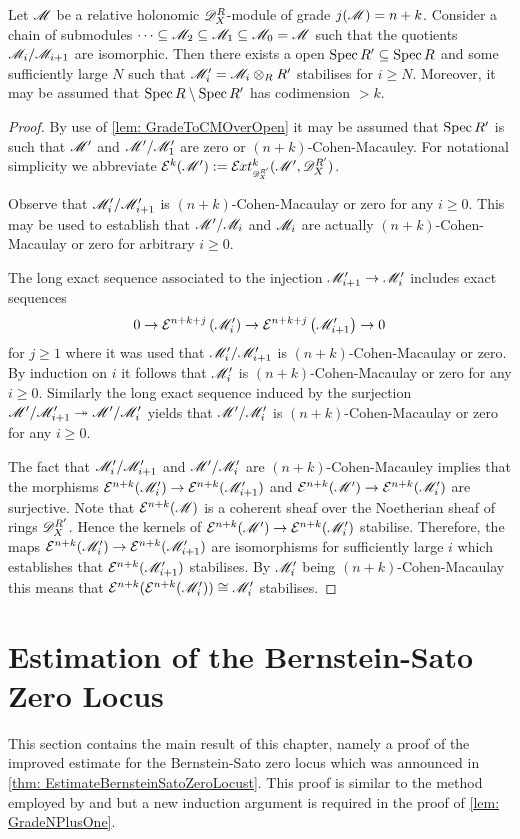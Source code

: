 \begin{lemma}\label{lem: StabilisationChains}
  Let $\mathscr{M}$ be a relative holonomic $\mathscr{D}_X^R$-module of grade $j(\mathscr{M}) = n+k$.
  Consider a chain of submodules $\cdots \subseteq \mathscr{M}_2\subseteq\mathscr{M}_1 \subseteq \mathscr{M}_0 = \mathscr{M} $
  such that the quotients $\mathscr{M}_i/\mathscr{M}_{i+1}$ are isomorphic.
  Then there exists a open $\operatorname{Spec} R' \subseteq \operatorname{Spec} R$ and some sufficiently large $N$ such that $\mathscr{M}_i' = \mathscr{M}_i\otimes_R R'$ stabilises for $i\geq N$. Moreover, it may be assumed that $\operatorname{Spec} R \setminus \operatorname{Spec} R'$ has codimension $>k$.
\end{lemma}
\begin{proof}
  By use of \cref{lem: GradeToCMOverOpen} it may be assumed that $\operatorname{Spec} R'$ is such that $\mathscr{M}'$ and $\mathscr{M}'/\mathscr{M}_1'$ are zero or $(n+k)$-Cohen-Macauley.
  For notational simplicity we abbreviate $\E^{k}(\M') :=\Ex{\D_X^{R'}}{k}(\M',\D_X^{R'})$.

  Observe that $ \mathscr{M}_i'/\mathscr{M}_{i+1}'$ is $(n+k)$-Cohen-Macaulay or zero for any $i\geq 0$.
  This may be used to establish that $\mathscr{M}'/\mathscr{M}_i$ and $\mathscr{M}_i$ are actually $(n+k)$-Cohen-Macaulay or zero for arbitrary $i\geq 0$.

  The long exact sequence associated to the injection $ \mathscr{M}_{i+1}'\to \mathscr{M}_i'$ includes exact sequences
  $$0 \to  \mathcal{E}^{n+k+j}\left(\mathscr{M}_i'\right) \to \mathcal{E}^{n+k +j}\left( \mathscr{M}_{i+1}'\right)\to 0$$
  for $j\geq 1$ where it was used that $\mathscr{M}_i'/\mathscr{M}_{i+1}'$ is $(n+k)$-Cohen-Macaulay or zero.
  By induction on $i$ it follows that $\mathscr{M}_i'$ is $(n+k)$-Cohen-Macaulay or zero for any $i\geq 0$.
  Similarly the long exact sequence induced by the surjection $\mathscr{M}'/\mathscr{M}_{i+1}' \twoheadrightarrow \mathscr{M}'/\mathscr{M}_i'$ yields that $\mathscr{M}'/\mathscr{M}_i'$ is $(n+k)$-Cohen-Macaulay or zero for any $i\geq 0$.


  The fact that $\mathscr{M}_i'/\mathscr{M}_{i+1}'$ and $\mathscr{M}'/\mathscr{M}_{i}'$ are $(n+k)$-Cohen-Macauley implies that the morphisms $\mathcal{E}^{n+k}(\mathscr{M}_i') \to  \mathcal{E}^{n+k}(\mathscr{M}_{i+1}')$ and $\mathcal{E}^{n+k}(\mathscr{M}') \to \mathcal{E}^{n+k} (\mathscr{M}_i')$ are surjective.
  Note that $\mathcal{E}^{n+k}(\mathscr{M})$ is a coherent sheaf over the Noetherian sheaf of rings $\mathscr{D}_X^{R'}$.
  Hence the kernels of $\mathcal{E}^{n+k}(\mathscr{M}') \to \mathcal{E}^{n+k} (\mathscr{M}_i')$ stabilise.
  Therefore, the maps $\mathcal{E}^{n+k}(\mathscr{M}_i') \to  \mathcal{E}^{n+k}(\mathscr{M}_{i+1}')$ are isomorphisms for sufficiently large $i$ which establishes that $\mathcal{E}^{n+k}(\mathscr{M}_{i+1}')$ stabilises.
  By $ \mathscr{M}_i'$ being $(n+k)$-Cohen-Macaulay this means that $\mathcal{E}^{n+k}(\mathcal{E}^{n+k}(\mathscr{M}_i')) \cong \mathscr{M}_i'$ stabilises.
\end{proof}
\section{Estimation of the Bernstein-Sato Zero Locus}\label{sec: EstimationBSZeroLocust}
This section contains the main result of this chapter, namely a proof of the improved estimate for the Bernstein-Sato zero locus which was announced in \cref{thm: EstimateBernsteinSatoZeroLocust}.
This proof is similar to the method employed by \cite{lichtin1989poles} and \cite{kashiwara1976b} but a new induction argument is required in the proof of \cref{lem: GradeNPlusOne}.\\

